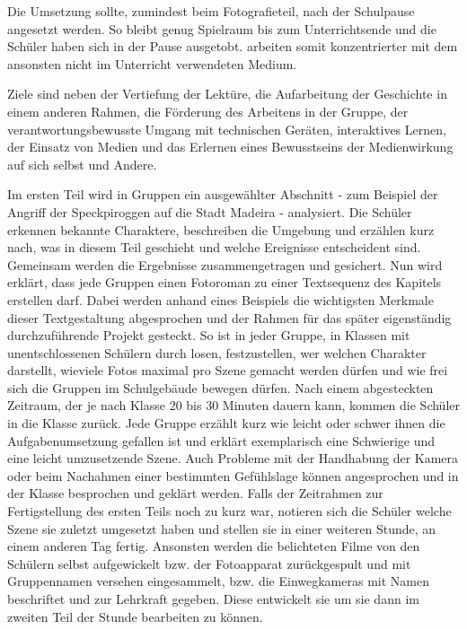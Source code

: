 Die Umsetzung sollte, zumindest beim Fotografieteil, nach der Schulpause angesetzt werden. So bleibt genug Spielraum bis zum Unterrichtsende und die Schüler haben sich in der Pause ausgetobt. arbeiten somit konzentrierter mit dem ansonsten nicht im Unterricht verwendeten Medium.

Ziele sind neben der Vertiefung der Lektüre, die Aufarbeitung der Geschichte in einem anderen Rahmen, die Förderung des Arbeitens in der Gruppe, der verantwortungsbewusste Umgang mit technischen Geräten, interaktives Lernen, der Einsatz von Medien und das Erlernen eines Bewusstseins der Medienwirkung auf sich selbst und Andere.

Im ersten Teil wird in Gruppen ein ausgewählter Abschnitt - zum Beispiel der Angriff der Speckpiroggen auf die Stadt Madeira \cite[180ff]{pir} - analysiert. Die Schüler erkennen bekannte Charaktere, beschreiben die Umgebung und erzählen kurz nach, was in diesem Teil geschieht und welche Ereignisse entscheident sind. Gemeinsam werden die Ergebnisse zusammengetragen und gesichert.  Nun wird erklärt, dass jede Gruppen einen Fotoroman zu einer Textsequenz des Kapitels erstellen darf. Dabei werden anhand eines Beispiels die wichtigsten Merkmale dieser Textgestaltung abgesprochen und der Rahmen für das später eigenständig durchzuführende Projekt gesteckt. So ist in jeder Gruppe, in Klassen mit unentschlossenen Schülern durch losen, festzustellen, wer welchen Charakter darstellt, wieviele Fotos maximal pro Szene gemacht werden dürfen und wie frei sich die Gruppen im Schulgebäude bewegen dürfen. Nach einem abgesteckten Zeitraum, der je nach Klasse 20 bis 30 Minuten dauern kann, kommen die Schüler in die Klasse zurück. Jede Gruppe erzählt kurz wie leicht oder schwer ihnen die Aufgabenumsetzung gefallen ist und erklärt exemplarisch eine Schwierige und eine leicht umzusetzende Szene. Auch Probleme mit der Handhabung der Kamera oder beim Nachahmen einer bestimmten Gefühlslage können angesprochen und in der Klasse besprochen und geklärt werden. Falls der Zeitrahmen zur Fertigstellung des ersten Teils noch zu kurz war, notieren sich die Schüler welche Szene sie zuletzt umgesetzt haben und stellen sie in einer weiteren Stunde, an einem anderen Tag fertig. Ansonsten werden die belichteten Filme von den Schülern selbst aufgewickelt bzw. der Fotoapparat zurückgespult und mit Gruppennamen versehen eingesammelt, bzw. die Einwegkameras mit Namen beschriftet und zur Lehrkraft gegeben. Diese entwickelt sie um sie dann im zweiten Teil der Stunde bearbeiten zu können.

